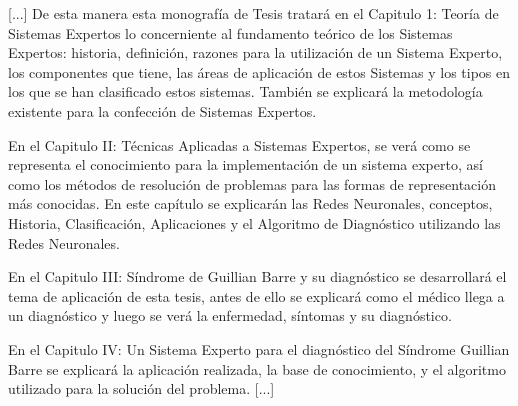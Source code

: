 \documentclass[preprint,12pt]{elsarticle}
\begin{document}
[...] De esta manera esta monografía de Tesis tratará en el Capitulo 1: Teoría de Sistemas Expertos lo concerniente al fundamento teórico de los Sistemas Expertos: historia, definición, razones para la utilización de un Sistema Experto, los componentes que tiene, las áreas de aplicación de estos Sistemas y los tipos en los que se han clasificado estos sistemas. También se explicará la metodología existente para la confección de Sistemas Expertos.

En el Capitulo II: Técnicas Aplicadas a Sistemas Expertos, se verá como se representa el conocimiento para la implementación de un sistema experto, así como los métodos de resolución de problemas para las formas de representación más conocidas. En este capítulo se explicarán las Redes Neuronales, conceptos, Historia, Clasificación, Aplicaciones y el Algoritmo de Diagnóstico utilizando las Redes Neuronales.

En el Capitulo III: Síndrome de Guillian Barre y su diagnóstico se desarrollará el tema de aplicación de esta tesis, antes de ello se explicará como el médico llega a un diagnóstico y luego se verá la enfermedad, síntomas y su diagnóstico.

En el Capitulo IV: Un Sistema Experto para el diagnóstico del Síndrome Guillian Barre se explicará la aplicación realizada, la base de conocimiento, y el algoritmo utilizado para la solución del problema. [...]
\end{document}
